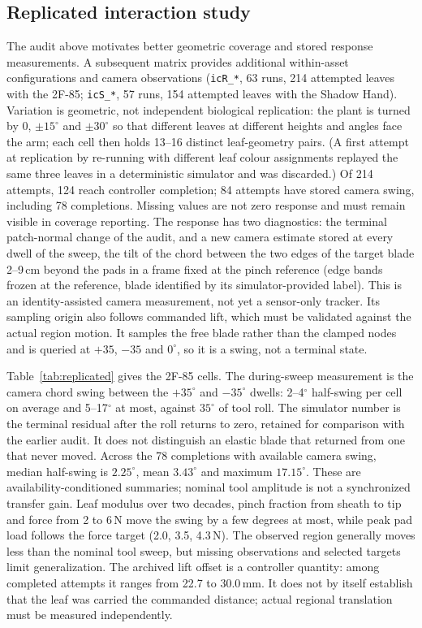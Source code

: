 \documentclass[letterpaper, 10 pt, conference]{ieeeconf}
\begin{document}
\subsection{Replicated interaction study}\label{sec:replicated}
The audit above motivates better geometric coverage and stored response measurements.
A subsequent matrix provides additional within-asset configurations and camera observations
(\texttt{icR\_*}, 63 runs, 214 attempted leaves with the 2F-85; \texttt{icS\_*}, 57 runs,
154 attempted leaves with the Shadow Hand).
Variation is geometric, not independent biological replication: the plant is turned by $0$, $\pm15^\circ$ and $\pm30^\circ$ so
that different leaves at different heights and angles face the arm; each cell then holds
13--16 distinct leaf-geometry pairs. (A first attempt at replication by re-running with
different leaf colour assignments replayed the same three leaves in a deterministic
simulator and was discarded.) Of 214 attempts, 124 reach controller completion; 84
attempts have stored camera swing, including 78 completions. Missing values are not zero
response and must remain visible in coverage reporting. The response has two diagnostics: the terminal patch-normal
change of the audit, and a new camera estimate stored at every dwell of the sweep, the tilt
of the chord between the two edges of the target blade 2--9\,cm beyond the pads in a frame
fixed at the pinch reference (edge bands frozen at the reference, blade identified by its
simulator-provided label). This is an identity-assisted camera measurement, not yet a
sensor-only tracker. Its sampling origin also follows commanded lift, which must be
validated against the actual region motion. It samples the free blade rather than the
clamped nodes and is queried at $+35$,
$-35$ and $0^\circ$, so it is a swing, not a terminal state.

Table~\ref{tab:replicated} gives the 2F-85 cells. The during-sweep measurement is the
camera chord swing between the $+35^\circ$ and $-35^\circ$ dwells: 2--4$^\circ$ half-swing
per cell on average and 5--17$^\circ$ at most, against $35^\circ$ of tool roll. The
simulator number is the terminal residual after the roll returns to zero, retained for
comparison with the earlier audit. It does not distinguish an elastic blade that returned
from one that never moved. Across the 78 completions with available camera swing, median
half-swing is $2.25^\circ$, mean $3.43^\circ$ and maximum $17.15^\circ$. These are
availability-conditioned summaries; nominal tool amplitude is not a synchronized transfer gain. Leaf modulus over two decades, pinch fraction from sheath to tip and force from 2 to
6\,N move the swing by a few degrees at most, while peak pad load follows the force target
(2.0, 3.5, 4.3\,N). The observed region generally moves less than the nominal tool sweep, but missing
observations and selected targets limit generalization. The archived lift offset is a
controller quantity: among completed attempts it ranges from 22.7 to 30.0\,mm. It does not
by itself establish that the leaf was carried the commanded distance; actual regional
translation must be measured independently.
\end{document}
